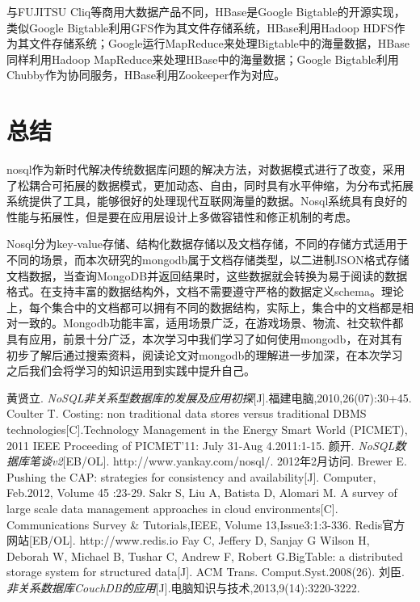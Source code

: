 \documentclass[11pt, a4paper, oneside]{ctexart}
\begin{document}
与FUJITSU Cliq等商用大数据产品不同，HBase是Google Bigtable的开源实现，类似Google Bigtable利用GFS作为其文件存储系统，HBase利用Hadoop HDFS作为其文件存储系统；Google运行MapReduce来处理Bigtable中的海量数据，HBase同样利用Hadoop MapReduce来处理HBase中的海量数据；Google Bigtable利用 Chubby作为协同服务，HBase利用Zookeeper作为对应。
\section{总结}
nosql作为新时代解决传统数据库问题的解决方法，对数据模式进行了改变，采用了松耦合可拓展的数据模式，更加动态、自由，同时具有水平伸缩，为分布式拓展系统提供了工具，能够很好的处理现代互联网海量的数据。Nosql系统具有良好的性能与拓展性，但是要在应用层设计上多做容错性和修正机制的考虑。

Nosql分为key-value存储、结构化数据存储以及文档存储，不同的存储方式适用于不同的场景，而本次研究的mongodb属于文档存储类型，以二进制JSON格式存储文档数据，当查询MongoDB并返回结果时，这些数据就会转换为易于阅读的数据格式。在支持丰富的数据结构外，文档不需要遵守严格的数据定义schema。理论上，每个集合中的文档都可以拥有不同的数据结构，实际上，集合中的文档都是相对一致的。Mongodb功能丰富，适用场景广泛，在游戏场景、物流、社交软件都具有应用，前景十分广泛，本次学习中我们学习了如何使用mongodb，在对其有初步了解后通过搜索资料，阅读论文对mongodb的理解进一步加深，在本次学习之后我们会将学习的知识运用到实践中提升自己。

\newpage
\begin{thebibliography}{99}
    黄贤立. \emph{NoSQL非关系型数据库的发展及应用初探}[J].福建电脑,2010,26(07):30+45.
    Coulter T. Costing: non traditional data stores versus traditional DBMS technologies[C].Technology Management in the Energy Smart World (PICMET), 2011 IEEE Proceeding of PICMET'11: July 31-Aug 4.2011:1-15.
    颜开. \emph{NoSQL数据库笔谈v2}[EB/OL]. http://www.yankay.com/nosql/. 2012年2月访问.
    Brewer E. Pushing the CAP: strategies for consistency and availability[J]. Computer, Feb.2012, Volume 45 :23-29.
    Sakr S, Liu A, Batista D, Alomari M. A survey of large scale data management approaches in cloud environments[C]. Communications Survey \& Tutorials,IEEE, Volume 13,Issue3:1:3-336.
    Redis官方网站[EB/OL]. http://www.redis.io
    Fay C, Jeffery D, Sanjay G Wilson H, Deborah W, Michael B, Tushar C, Andrew F, Robert G.BigTable: a distributed storage system for structured data[J]. ACM Trans. Comput.Syst.2008(26).
    刘臣.\emph{非关系数据库CouchDB的应用}[J].电脑知识与技术,2013,9(14):3220-3222.
\end{thebibliography}
\end{document}
